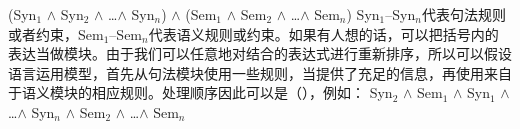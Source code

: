 \ea
(Syn$_1$ $\wedge$ Syn$_2$ $\wedge$ \ldots $\wedge$ Syn$_n$) $\wedge$ (Sem$_1$ $\wedge$ Sem$_2$ $\wedge$ \ldots $\wedge$ Sem$_n$)
\z
Syn$_1$--Syn$_n$代表句法规则或者约束，Sem$_1$--Sem$_n$代表语义规则或约束。如果有人想的话，可以把括号内的表达当做模块。由于我们可以任意地对结合的表达式进行重新排序，所以可以假设语言运用模型，首先从句法模块使用一些规则，当提供了充足的信息，再使用来自于语义模块的相应规则。处理顺序因此可以是（），例如：
\ea
Syn$_2$ $\wedge$ Sem$_1$ $\wedge$ Syn$_1$ $\wedge$ \ldots $\wedge$ Syn$_n$ $\wedge$ Sem$_2$ $\wedge$ \ldots $\wedge$ Sem$_n$
\z

